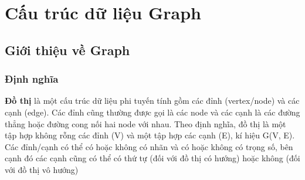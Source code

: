 \documentclass[a4paper]{article}
\begin{document}

\newpage
\tableofcontents
\newpage
\section{Cấu trúc dữ liệu Graph}
    \subsection{Giới thiệu về Graph}
        \subsubsection{Định nghĩa}
\textbf{Đồ thị} là một cấu trúc dữ liệu phi tuyến tính gồm các đỉnh (vertex/node) và các cạnh (edge). Các đỉnh cũng thường được gọi là các node và các cạnh là các đường thẳng hoặc đường cong nối hai node với nhau. Theo định nghĩa, đồ thị là một tập hợp không rỗng các đỉnh (V) và một tập hợp các cạnh (E), kí hiệu G(V, E). Các đỉnh/cạnh có thể có hoặc không có nhãn và có hoặc không có trọng số, bên cạnh đó các cạnh cũng có thể có thứ tự (đối với đồ thị có hướng) hoặc không (đối với đồ thị vô hướng)
\end{document}
